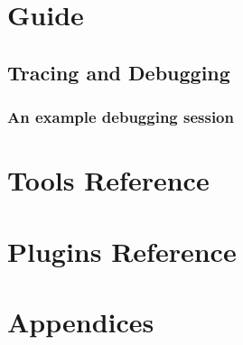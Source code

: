 \mainmatter

\part{Guide}








\chapter{Tracing and Debugging}
\section{An example debugging session}

\part{Tools Reference}







\part{Plugins Reference}


\part{Appendices}


